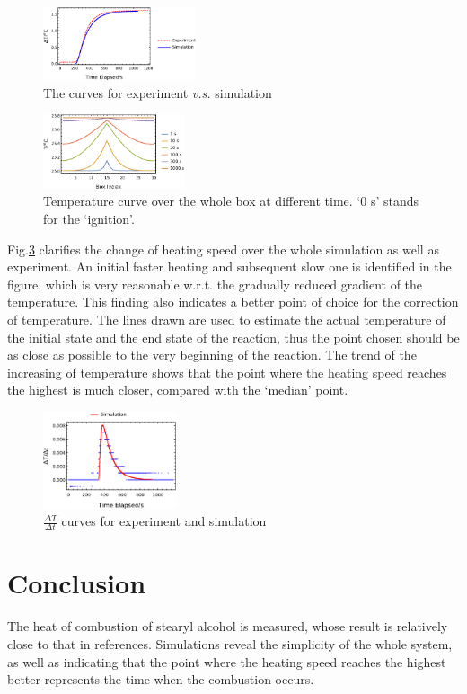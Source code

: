 \documentclass[%
 reprint,
 amsmath,amssymb,
 aps,
10.5pt,
]{revtex4-1}
\begin{document}
\begin{figure}
\centering
\includegraphics[width=0.4\textwidth]{figures/simuvsexp.eps}
\caption{The curves for experiment \emph{v.s.} simulation}
\label{expsim}
\end{figure}

\begin{figure}
\centering
\includegraphics[width=0.37\textwidth]{figures/combustbox.eps}
\caption{Temperature curve over the whole box at different time. `0 s' stands for the `ignition'.}
\label{combustbox}
\end{figure}

Fig.\ref{diff} clarifies the change of heating speed over the whole simulation as well as experiment. An initial faster heating and subsequent slow one is identified in the figure, which is very reasonable w.r.t. the gradually reduced gradient of the temperature. This finding also indicates a better point of choice for the correction of temperature. The lines drawn are used to estimate the actual temperature of the initial state and the end state of the reaction, thus the point chosen should be as close as possible to the very beginning of the reaction. The trend of the increasing of temperature shows that the point where the heating speed reaches the highest is much closer, compared with the `median' point. 

\begin{figure}
\centering
\includegraphics[width=0.35\textwidth]{figures/diff.eps}
\caption{$\frac{\Delta T}{\Delta t}$ curves for experiment and simulation}
\label{diff}
\end{figure}

\section{Conclusion}
The heat of combustion of stearyl alcohol is measured, whose result is relatively close to that in references. Simulations reveal the simplicity of the whole system, as well as indicating that the point where the heating speed reaches the highest better represents the time when the combustion occurs.


\end{document}
